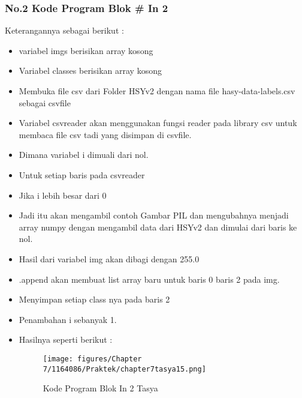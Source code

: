 \subsubsection{No.2 Kode Program Blok \# In 2}

Keterangannya sebagai berikut :
\begin{itemize}
\item variabel imgs berisikan array kosong
\item Variabel classes berisikan array kosong
\item Membuka file csv dari Folder HSYv2 dengan nama file hasy-data-labels.csv sebagai csvfile
\item Variabel csvreader akan menggunakan fungsi reader pada library csv untuk membaca file csv tadi yang disimpan di csvfile.
\item Dimana variabel i dimuali dari nol.
\item Untuk setiap baris pada  csvreader
\item Jika i lebih besar dari 0
\item Jadi itu akan mengambil contoh Gambar PIL dan mengubahnya menjadi array numpy dengan mengambil data dari HSYv2 dan dimulai dari baris ke nol.
\item Hasil dari variabel img akan dibagi dengan 255.0
\item .append akan membuat list array baru untuk baris 0 baris 2 pada img.
\item Menyimpan setiap class nya  pada baris 2
\item Penambahan i sebanyak 1. 
\item Hasilnya seperti berikut :
\begin{figure}[ht]
\centering
\texttt{[image: figures/Chapter 7/1164086/Praktek/chapter7tasya15.png]}
\caption{Kode Program Blok In 2 Tasya}
\label{Praktek}
\end{figure}
\end{itemize}

